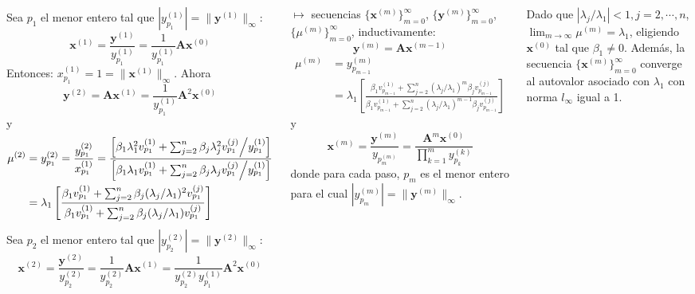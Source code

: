 \documentclass[9pt, aspectratio=169]{beamer}
\begin{document}
\begin{frame}
\vspace{1em}
\begin{columns}[t]
\cx
Sea $p_1$ el menor entero tal que $|y_{p_1}^{(1)}| = \lVert \bm{y}^{(1)} \rVert_{\infty}$:
\[ \bm{x}^{(1)} = \frac{\bm{y}^{(1)}}{y_{p_1}^{(1)}} = \frac{1}{y_{p_1}^{(1)}} \bm{A} \bm{x}^{(0)} \]
Entonces: $x_{p_1}^{(1)} = 1 = \lVert \bm{x}^{(1)} \rVert_{\infty}$. Ahora
\[ \bm{y}^{(2)} = \bm{A} \bm{x}^{(1)} = \frac{1}{y_{p_1}^{(1)}} \bm{A}^2 \bm{x}^{(0)} \]
y
\begin{align*}
    \mu^{(2)} &= y_{p_1}^{(2)} = \frac{y_{p_1}^{(2)}}{x_{p_1}^{(1)}} = \frac{ \left[ \beta_1 \lambda_1^2 v_{p_1}^{(1)} + \sum_{j=2}^n \beta_j \lambda_j^2 v_{p_1}^{(j)} \middle/ y_{p_1}^{(1)} \right]}{ \left[ \beta_1 \lambda_1 v_{p_1}^{(1)} + \sum_{j=2}^n \beta_j \lambda_j v_{p_1}^{(j)} \middle/ y_{p_1}^{(1)} \right]} \\
              &= \lambda_1 \left[ \frac{\beta_1 v_{p_1}^{(1)} + \sum_{j=2}^n \beta_j (\lambda_j/\lambda_1)^2 v_{p_1}^{(j)}}{\beta_1 v_{p_1}^{(1)} + \sum_{j=2}^n \beta_j (\lambda_j/\lambda_1) v_{p_1}^{(j)}} \right]
\end{align*}
Sea $p_2$ el menor entero tal que $|y_{p_2}^{(2)}| = \lVert \bm{y}^{(2)} \rVert_{\infty}$:
\[ \bm{x}^{(2)} = \frac{\bm{y}^{(2)}}{y_{p_2}^{(2)}} = \frac{1}{y_{p_2}^{(2)}} \bm{A} \bm{x}^{(1)} = \frac{1}{y_{p_2}^{(2)} y_{p_1}^{(1)}} \bm{A}^2 \bm{x}^{(0)} \]

\cx
$\mapsto$ secuencias $\{ \bm{x}^{(m)} \}_{m=0}^{\infty}$, $\{ \bm{y}^{(m)} \}_{m=0}^{\infty}$, $\{ \mu^{(m)} \}_{m=0}^{\infty}$, inductivamente:
\[ \bm{y}^{(m)} = \bm{A} \bm{x}^{(m-1)} \] 
\begin{align*} \mu^{(m)} &= y_{p_{m - 1}}^{(m)} \\
&= \lambda_1 \left[ \frac{\beta_1 v_{p_{m-1}}^{(1)} + \sum_{j=2}^n (\lambda_j/\lambda_1)^m \beta_j v_{p_{m-1}}^{(j)}}{\beta_1 v_{p_{m-1}}^{(1)} + \sum_{j=2}^n (\lambda_j/\lambda_1)^{m-1} \beta_j v_{p_{m-1}}^{(j)}} \right] \end{align*}
y
\[ \bm{x}^{(m)} = \frac{\bm{y}^{(m)}}{y_{p_{m}^{(m)}}} = \frac{\bm{A}^m \bm{x}^{(0)}}{ \prod_{k=1}^m y_{p_k}^{(k)}} \]
donde para cada paso, $p_m$ es el menor entero para el cual $|y_{p_m}^{(m)}| = \lVert \bm{y}^{(m)} \rVert_{\infty}$.

Dado que $|\lambda_j/\lambda_1| < 1, j=2, \cdots, n$, $\lim_{m \rightarrow \infty} \mu^{(m)} = \lambda_1$, eligiendo $\bm{x}^{(0)}$ tal que $\beta_1 \neq 0$. Además, la secuencia $\{ \bm{x}^{(m)} \}_{m=0}^{\infty}$ converge al autovalor asociado con $\lambda_1$ con norma $l_{\infty}$ igual a 1.
\end{columns}
\end{frame}
\end{document}
